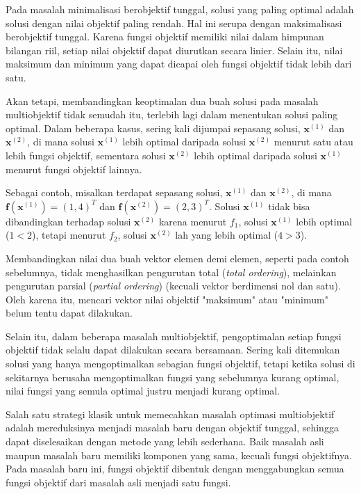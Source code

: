 
Pada masalah minimalisasi berobjektif tunggal, solusi yang paling optimal adalah solusi dengan nilai objektif paling rendah. Hal ini serupa dengan maksimalisasi berobjektif tunggal. Karena fungsi objektif memiliki nilai dalam himpunan bilangan riil, setiap nilai objektif dapat diurutkan secara linier. Selain itu, nilai maksimum dan minimum yang dapat dicapai oleh fungsi objektif tidak lebih dari satu.

Akan tetapi, membandingkan keoptimalan dua buah solusi pada masalah multiobjektif tidak semudah itu, terlebih lagi dalam menentukan solusi paling optimal. Dalam beberapa kasus, sering kali dijumpai sepasang solusi, $\mathbf{x}^{(1)}$ dan $\mathbf{x}^{(2)}$, di mana solusi $\mathbf{x}^{(1)}$ lebih optimal daripada solusi $\mathbf{x}^{(2)}$ menurut satu atau lebih fungsi objektif, sementara solusi $\mathbf{x}^{(2)}$ lebih optimal daripada solusi $\mathbf{x}^{(1)}$ menurut fungsi objektif lainnya. 

Sebagai contoh, misalkan terdapat sepasang solusi, $\mathbf{x}^{(1)}$ dan $\mathbf{x}^{(2)}$, di mana $\mathbf{f}(\mathbf{x}^{(1)})=(1,4)^T$ dan $\mathbf{f}(\mathbf{x}^{(2)})=(2,3)^T$. Solusi $\mathbf{x}^{(1)}$ tidak bisa dibandingkan terhadap solusi $\mathbf{x}^{(2)}$ karena menurut $f_1$, solusi $\mathbf{x}^{(1)}$ lebih optimal ($1 < 2$), tetapi menurut $f_2$, solusi $\mathbf{x}^{(2)}$ lah yang lebih optimal ($4 > 3$). 

Membandingkan nilai dua buah vektor elemen demi elemen, seperti pada contoh sebelumnya, tidak menghasilkan pengurutan total (\textit{total ordering}), melainkan pengurutan parsial (\textit{partial ordering}) (kecuali vektor berdimensi nol dan satu). Oleh karena itu, mencari vektor nilai objektif "maksimum" atau "minimum" belum tentu dapat dilakukan.  

Selain itu, dalam beberapa masalah multiobjektif, pengoptimalan setiap fungsi objektif tidak selalu dapat dilakukan secara bersamaan. Sering kali ditemukan solusi yang hanya mengoptimalkan sebagian fungsi objektif, tetapi ketika solusi di sekitarnya berusaha mengoptimalkan fungsi yang sebelumnya kurang optimal, nilai fungsi yang semula optimal justru menjadi kurang optimal.

Salah satu strategi klasik untuk memecahkan masalah optimasi multiobjektif adalah mereduksinya menjadi masalah baru dengan objektif tunggal, sehingga dapat diselesaikan dengan metode yang lebih sederhana. Baik masalah asli maupun masalah baru memiliki komponen yang sama, kecuali fungsi objektifnya. Pada masalah baru ini, fungsi objektif dibentuk dengan menggabungkan semua fungsi objektif dari masalah asli menjadi satu fungsi. 

